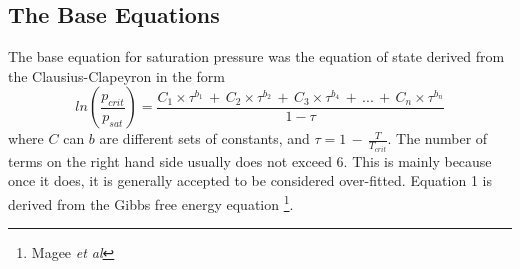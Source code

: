 \documentclass{article}
\begin{document}
\begin{singlespacing}
\section*{The Base Equations}
The base equation for saturation pressure was the equation of state derived from the Clausius-Clapeyron in the form
\begin{equation}
 ln(\frac{p_{crit}}{p_{sat}}) = \frac{C_{1} \times \tau^{b_1} \,+\, C_{2}\times \tau^{b_2} \, + \, C_{3}\times \tau^{b_4} \, + \, ... \, + \, C_{n} \times \tau^{b_n}}{1-\tau}
 \end{equation}
where $C$ can $b$ are different sets of constants, and $\tau = 1\, - \, \frac{T}{T_{crit}}$. The number of terms on the right hand side usually does not exceed 6. This is mainly because once it does, it is generally accepted to be considered over-fitted. Equation 1 is derived from the Gibbs free energy equation \footnote{Magee \textit{et al}}.

\end{singlespacing}
\end{document}
